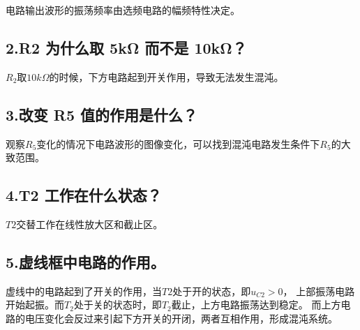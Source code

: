 \documentclass[UTF8]{ctexart}
\begin{document}
电路输出波形的振荡频率由选频电路的幅频特性决定。

\subsection*{2.R2 为什么取 5kΩ 而不是 10kΩ？}

$R_2$取$10k \Omega$的时候，下方电路起到开关作用，导致无法发生混沌。

\subsection*{3.改变 R5 值的作用是什么？}

观察$R_5$变化的情况下电路波形的图像变化，可以找到混沌电路发生条件下$R_5$的大致范围。

\subsection*{4.T2 工作在什么状态？}

$T2$交替工作在线性放大区和截止区。

\subsection*{5.虚线框中电路的作用。}

虚线中的电路起到了开关的作用，当$T2$处于开的状态，即$u_{C2}>0$，
上部振荡电路开始起振。而$T_2$处于关的状态时，即$T_2$截止，上方电路振荡达到稳定。
而上方电路的电压变化会反过来引起下方开关的开闭，两者互相作用，形成混沌系统。
\end{document}
